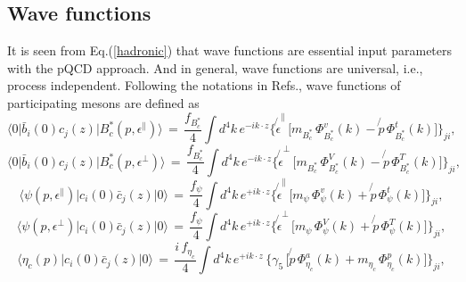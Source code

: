 \documentclass[preprint,superscriptaddress,nofootinbib]{revtex4}
\begin{document}
  \subsection{Wave functions}
  \label{sec0204}
  It is seen from Eq.(\ref{hadronic}) that wave functions are
  essential input parameters with the pQCD approach.
  And in general, wave functions are universal, i.e., process independent.
  Following the notations in Refs.\cite{prd65,jhep.0605.004},
  wave functions of participating mesons are defined as
  \begin{equation}
 {\langle}0{\vert}\bar{b}_{i}(0)c_{j}(z)
 {\vert}B_{c}^{\ast}(p,{\epsilon}^{\parallel}){\rangle}\,
 =\, \frac{f_{B_{c}^{\ast}}}{4} {\int}d^{4}k\,e^{-ik{\cdot}z}
  \Big\{ \!\!\not{\!\epsilon}^{\parallel}\, \Big[
  m_{B_{c}^{\ast}}\, {\Phi}_{B_{c}^{\ast}}^{v}(k) -
  \!\!\not{p}\, {\Phi}_{B_{c}^{\ast}}^{t}(k) \Big] \Big\}_{ji}
  \label{wf-bc01},
  \end{equation}
  \begin{equation}
 {\langle}0{\vert}\bar{b}_{i}(0)c_{j}(z)
 {\vert}B_{c}^{\ast}(p,{\epsilon}^{\perp}){\rangle}\,
 =\, \frac{f_{B_{c}^{\ast}}}{4} {\int}d^{4}k\,e^{-ik{\cdot}z}
  \Big\{ \!\!\not{\!\epsilon}^{\perp}\, \Big[
  m_{B_{c}^{\ast}}\, {\Phi}_{B_{c}^{\ast}}^{V}(k) -
  \!\!\not{p}\, {\Phi}_{B_{c}^{\ast}}^{T}(k) \Big] \Big\}_{ji}
  \label{wf-bc02},
  \end{equation}
  \begin{equation}
 {\langle}{\psi}(p,{\epsilon}^{\parallel})
 {\vert}c_{i}(0)\bar{c}_{j}(z){\vert}0{\rangle}\,
 =\, \frac{f_{\psi}}{4} {\int}d^{4}k\,e^{+ik{\cdot}z}
  \Big\{ \!\!\not{\!\epsilon}^{\parallel}\, \Big[
  m_{\psi}\, {\Phi}_{\psi}^{v}(k) +
  \!\!\not{p}\, {\Phi}_{\psi}^{t}(k) \Big] \Big\}_{ji}
  \label{wf-ds02},
  \end{equation}
  \begin{equation}
 {\langle}{\psi}(p,{\epsilon}^{\perp}){\vert}c_{i}(0)\bar{c}_{j}(z){\vert}0{\rangle}\,
 =\, \frac{f_{\psi}}{4} {\int}d^{4}k\,e^{+ik{\cdot}z}
  \Big\{ \!\!\not{\!\epsilon}^{\perp}\, \Big[
  m_{\psi}\, {\Phi}_{\psi}^{V}(k) +
  \!\!\not{p}\, {\Phi}_{\psi}^{T}(k) \Big] \Big\}_{ji}
  \label{wf-ds03},
  \end{equation}
  \begin{equation}
 {\langle}{\eta}_{c}(p){\vert}c_{i}(0)\bar{c}_{j}(z){\vert}0{\rangle}\,
 =\, \frac{i\,f_{{\eta}_{c}}}{4}{\int}d^{4}k\,e^{+ik{\cdot}z}\,
  \Big\{ {\gamma}_{5}\, \Big[ \!\!\not{p}\,{\Phi}_{{\eta}_{c}}^{a}(k)
  +m_{{\eta}_{c}}\,{\Phi}_{{\eta}_{c}}^{p}(k) \Big] \Big\}_{ji}
  \label{wf-ds01},
  \end{equation}
\end{document}
